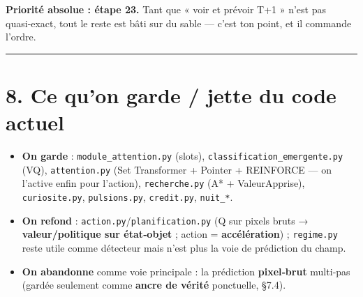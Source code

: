 \documentclass[
  french,
  11pt,
]{article}
\providecommand{\tightlist}{%
  \setlength{\itemsep}{0pt}\setlength{\parskip}{0pt}}
\begin{document}
\textbf{Priorité absolue : étape 23.} Tant que « voir et prévoir T+1 »
n'est pas quasi‑exact, tout le reste est bâti sur du sable --- c'est ton
point, et il commande l'ordre.

\begin{center}\rule{0.5\linewidth}{0.5pt}\end{center}

\section{8. Ce qu'on garde / jette du code
actuel}\label{ce-quon-garde-jette-du-code-actuel}

\begin{itemize}
\tightlist
\item
  \textbf{On garde} : \texttt{module\_attention.py} (slots),
  \texttt{classification\_emergente.py} (VQ), \texttt{attention.py} (Set
  Transformer + Pointer + REINFORCE --- on l'active enfin pour
  l'action), \texttt{recherche.py} (A* + ValeurApprise),
  \texttt{curiosite.py}, \texttt{pulsions.py}, \texttt{credit.py},
  \texttt{nuit\_*}.
\item
  \textbf{On refond} : \texttt{action.py}/\texttt{planification.py} (Q
  sur pixels bruts → \textbf{valeur/politique sur état‑objet} ; action =
  \textbf{accélération}) ; \texttt{regime.py} reste utile comme
  détecteur mais n'est plus la voie de prédiction du champ.
\item
  \textbf{On abandonne} comme voie principale : la prédiction
  \textbf{pixel‑brut} multi‑pas (gardée seulement comme \textbf{ancre de
  vérité} ponctuelle, §7.4).
\end{itemize}
\end{document}
